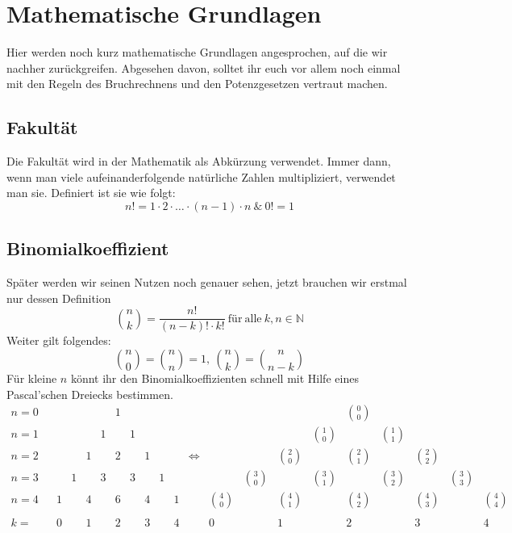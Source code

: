 \section{Mathematische Grundlagen}
Hier werden noch kurz mathematische Grundlagen angesprochen, auf die wir nachher zurückgreifen. Abgesehen davon, solltet ihr euch vor allem noch einmal mit den Regeln des Bruchrechnens und den Potenzgesetzen vertraut machen.

\subsection{Fakultät}
Die Fakultät wird in der Mathematik als Abkürzung verwendet. Immer dann, wenn man viele aufeinanderfolgende natürliche Zahlen multipliziert, verwendet man sie. Definiert ist sie wie folgt:
\[n!=1\cdot 2\cdot \ldots \cdot (n-1)\cdot n\ \&\ 0!=1\]

\subsection{Binomialkoeffizient}
Später werden wir seinen Nutzen noch genauer sehen, jetzt brauchen wir erstmal nur dessen Definition
\[\binom{n}{k}=\frac{n!}{(n-k)!\cdot k!}\mathrm{\ für\ alle\ }k,n\in \mathbb{N}\]
Weiter gilt folgendes:
\[\binom{n}{0}=\binom{n}{n}=1,\ \binom{n}{k}=\binom{n}{n-k}\]
Für kleine $n$ könnt ihr den Binomialkoeffizienten schnell mit Hilfe eines Pascal'schen Dreiecks bestimmen.\\
$
\begin{array}{ccccccccccccccccccccc}
n=0 &  &  &  &  &  & 1 &  &  &  &  &  &  &  &  &  & \binom{0}{0} &  &  &  & \\ 
n=1 &  &  &  &  & 1 &  & 1 &  &  &  &  &  &  &  & \binom{1}{0} &  & \binom{1}{1} &  &  & \\ 
n=2 &  &  &  & 1 &  & 2 &  & 1 &  &  & \Leftrightarrow &  &  & \binom{2}{0} &  & \binom{2}{1} &  & \binom{2}{2} &  & \\ 
n=3 &  &  & 1 &  & 3 &  & 3 &  & 1 &  &  &  & \binom{3}{0} &  & \binom{3}{1} &  & \binom{3}{2} &  & \binom{3}{3} & \\ 
n=4 &  & 1 &  & 4 &  & 6 &  & 4 &  & 1 &  & \binom{4}{0} &  & \binom{4}{1} &  & \binom{4}{2} &  & \binom{4}{3} &  & \binom{4}{4}\\
 & && && && && && && && && && &\\
k= & &0& &1& &2& &3& &4& &0& &1& &2& &3& &4   
\end{array} 
$

